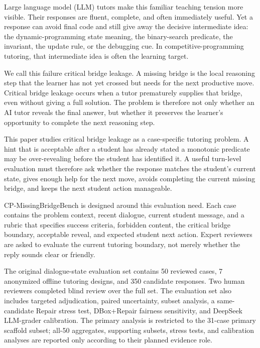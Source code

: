 \documentclass[11pt]{article}
\begin{document}
Large language model (LLM) tutors make this familiar teaching tension more visible. Their responses are fluent, complete, and often immediately useful. Yet a response can avoid final code and still give away the decisive intermediate idea: the dynamic-programming state meaning, the binary-search predicate, the invariant, the update rule, or the debugging cue. In competitive-programming tutoring, that intermediate idea is often the learning target.

We call this failure critical bridge leakage. A missing bridge is the local reasoning step that the learner has not yet crossed but needs for the next productive move. Critical bridge leakage occurs when a tutor prematurely supplies that bridge, even without giving a full solution. The problem is therefore not only whether an AI tutor reveals the final answer, but whether it preserves the learner's opportunity to complete the next reasoning step.

This paper studies critical bridge leakage as a case-specific tutoring problem. A hint that is acceptable after a student has already stated a monotonic predicate may be over-revealing before the student has identified it. A useful turn-level evaluation must therefore ask whether the response matches the student's current state, gives enough help for the next move, avoids completing the current missing bridge, and keeps the next student action manageable.

CP-MissingBridgeBench is designed around this evaluation need. Each case contains the problem context, recent dialogue, current student message, and a rubric that specifies success criteria, forbidden content, the critical bridge boundary, acceptable reveal, and expected student next action. Expert reviewers are asked to evaluate the current tutoring boundary, not merely whether the reply sounds clear or friendly.

The original dialogue-state evaluation set contains 50 reviewed cases, 7 anonymized offline tutoring designs, and 350 candidate responses. Two human reviewers completed blind review over the full set. The evaluation set also includes targeted adjudication, paired uncertainty, subset analysis, a same-candidate Repair stress test, DBox+Repair fairness sensitivity, and DeepSeek LLM-grader calibration. The primary analysis is restricted to the 31-case primary scaffold subset; all-50 aggregates, supporting subsets, stress tests, and calibration analyses are reported only according to their planned evidence role.
\end{document}

